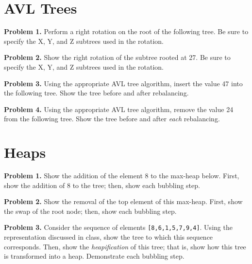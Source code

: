 \documentclass{article}
\begin{document}
\section{AVL Trees}

\noindent \textbf{Problem 1.} Perform a right rotation on the root of the following tree.  Be sure to specify the X, Y, and Z subtrees used in the rotation.


\noindent \textbf{Problem 2.} Show the right rotation of the subtree rooted at 27.  Be sure to specify the X, Y, and Z subtrees used in the rotation.



\noindent \textbf{Problem 3.} Using the appropriate AVL tree algorithm, insert the value 47 into the following tree.  Show the tree before and after rebalancing.



\noindent \textbf{Problem 4.} Using the appropriate AVL tree algorithm, remove the value 24 from the following tree.  Show the tree before and after \textit{each} rebalancing.



\section{Heaps}

\noindent \textbf{Problem 1.} Show the addition of the element 8 to the max-heap below.  First, show the addition of 8 to the tree; then, show each bubbling step.



\noindent \textbf{Problem 2.} Show the removal of the top element of this max-heap.  First, show the swap of the root node; then, show each bubbling step.



\noindent \textbf{Problem 3.} Consider the sequence of elements \texttt{[8,6,1,5,7,9,4]}.  Using the representation discussed in class, show the tree to which this sequence corresponds.  Then, show the \textit{heapification} of this tree; that is, show how this tree is transformed into a heap.  Demonstrate each bubbling step.


\end{document}
